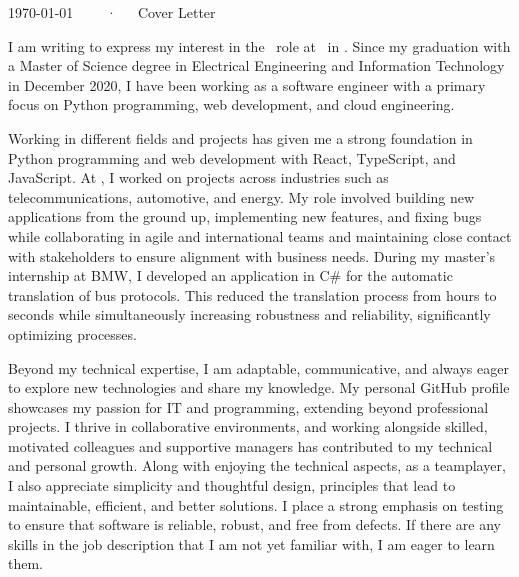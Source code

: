 \documentclass[11pt, a4paper]{awesome-cv}
\begin{document}
 \makecvheader[R]

\makecvfooter
  {\today}
  {\firstName\ \lastName~~~·~~~Cover Letter}
  {}

\makelettertitle

\begin{cvletter}

I am writing to express my interest in the \ROLE\ role at \COMPANY\ in \CITY. Since my graduation with a Master of Science degree in Electrical Engineering and Information Technology in December 2020, I have been working as a software engineer with a primary focus on Python programming, web development, and cloud engineering.

Working in different fields and projects has given me a strong foundation in Python programming and web development with React, TypeScript, and JavaScript. At \companynow, I worked on projects across industries such as telecommunications, automotive, and energy. My role involved building new applications from the ground up, implementing new features, and fixing bugs while collaborating in agile and international teams and maintaining close contact with stakeholders to ensure alignment with business needs. During my master's internship at BMW, I developed an application in C\# for the automatic translation of bus protocols. This reduced the translation process from hours to seconds while simultaneously increasing robustness and reliability, significantly optimizing processes.

Beyond my technical expertise, I am adaptable, communicative, and always eager to explore new technologies and share my knowledge. My personal GitHub profile showcases my passion for IT and programming, extending beyond professional projects. I thrive in collaborative environments, and working alongside skilled, motivated colleagues and supportive managers has contributed to my technical and personal growth. Along with enjoying the technical aspects, as a teamplayer, I also appreciate simplicity and thoughtful design, principles that lead to maintainable, efficient, and better solutions. I place a strong emphasis on testing to ensure that software is reliable, robust, and free from defects. If there are any skills in the job description that I am not yet familiar with, I am eager to learn them.


\end{cvletter}
\end{document}
